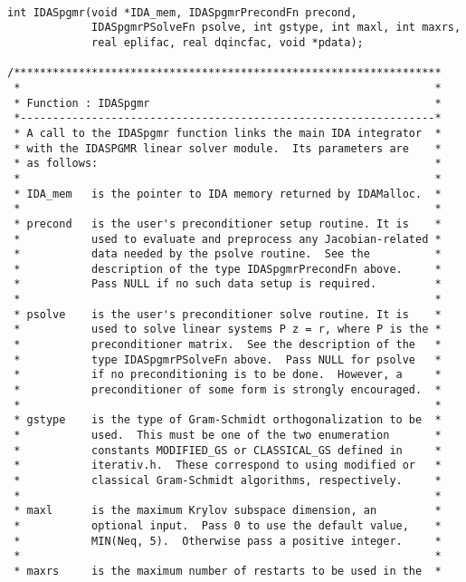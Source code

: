 \documentclass[11pt]{article}
\begin{document}
\small
\begin{verbatim}

int IDASpgmr(void *IDA_mem, IDASpgmrPrecondFn precond, 
             IDASpgmrPSolveFn psolve, int gstype, int maxl, int maxrs,
             real eplifac, real dqincfac, void *pdata); 
 
/******************************************************************
 *                                                                *
 * Function : IDASpgmr                                            *
 *----------------------------------------------------------------*
 * A call to the IDASpgmr function links the main IDA integrator  *
 * with the IDASPGMR linear solver module.  Its parameters are    *
 * as follows:                                                    *
 *                                                                *
 * IDA_mem   is the pointer to IDA memory returned by IDAMalloc.  *
 *                                                                *
 * precond   is the user's preconditioner setup routine. It is    *
 *           used to evaluate and preprocess any Jacobian-related *
 *           data needed by the psolve routine.  See the          *
 *           description of the type IDASpgmrPrecondFn above.     *
 *           Pass NULL if no such data setup is required.         *
 *                                                                *
 * psolve    is the user's preconditioner solve routine. It is    *
 *           used to solve linear systems P z = r, where P is the *
 *           preconditioner matrix.  See the description of the   *
 *           type IDASpgmrPSolveFn above.  Pass NULL for psolve   * 
 *           if no preconditioning is to be done.  However, a     *
 *           preconditioner of some form is strongly encouraged.  *
 *                                                                *
 * gstype    is the type of Gram-Schmidt orthogonalization to be  *
 *           used.  This must be one of the two enumeration       *
 *           constants MODIFIED_GS or CLASSICAL_GS defined in     *
 *           iterativ.h.  These correspond to using modified or   *
 *           classical Gram-Schmidt algorithms, respectively.     *
 *                                                                *
 * maxl      is the maximum Krylov subspace dimension, an         *
 *           optional input.  Pass 0 to use the default value,    *
 *           MIN(Neq, 5).  Otherwise pass a positive integer.     *
 *                                                                *
 * maxrs     is the maximum number of restarts to be used in the  *

\end{verbatim}
\end{document}
